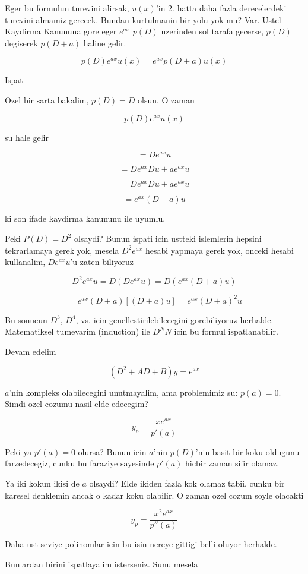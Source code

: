 \documentclass[12pt,fleqn]{article}
\begin{document}
Eger bu formulun turevini alirsak, $u(x)$'in 2. hatta daha fazla
derecelerdeki turevini almamiz gerecek. Bundan kurtulmanin bir yolu yok mu?
Var. Ustel Kaydirma Kanununa gore eger $e^{ax}$ $p(D)$ uzerinden sol tarafa
gecerse, $p(D)$ degiserek $p(D+a)$ haline gelir. 

\[ p(D)e^{ax}u(x) = e^{ax}p(D+a)u(x)\]

Ispat

Ozel bir sarta bakalim, $p(D) = D$ olsun. O zaman 

\[ p(D)e^{ax}u(x) \]

su hale gelir

\[ = De^{ax}u\]

\[ = De^{ax}Du + ae^{ax}u \]

\[ = De^{ax}Du + ae^{ax}u \]

\[ = e^{ax}(D + a)u \]

ki son ifade kaydirma kanununu ile uyumlu. 

Peki $P(D) = D^2$ olsaydi? Bunun ispati icin ustteki islemlerin hepsini
tekrarlamaya gerek yok, mesela $D^2e^{ax}$ hesabi yapmaya gerek yok,
onceki hesabi kullanalim, $De^{ax}u$'u zaten biliyoruz

\[  D^2e^{ax}u = D(De^{ax}u) = D(e^{ax}(D+a)u)  \]

\[ = e^{ax}(D+a)[(D+a)u] = e^{ax}(D+a)^2u \]

Bu sonucun $D^3$, $D^4$, vs. icin genellestirilebilecegini gorebiliyoruz
herhalde. Matematiksel tumevarim (induction) ile $D^NN$ icin bu formul
ispatlanabilir. 

Devam edelim

\[ (D^2+AD+B)y = e^{ax} \]

$a$'nin kompleks olabilecegini unutmayalim, ama problemimiz su: $p(a) =
0$.
Simdi ozel cozumu nasil elde edecegim? 

\[ y_p = \frac{x e^{ax}}{p'(a)} \]

Peki ya $p'(a) = 0$  olursa? Bunun icin $a$'nin $p(D)$'nin basit bir koku
oldugunu farzedecegiz, cunku bu faraziye sayesinde $p'(a)$ hicbir zaman
sifir olamaz. 

Ya iki kokun ikisi de $a$ olsaydi? Elde ikiden fazla kok olamaz tabii,
cunku bir karesel denklemin ancak o kadar koku olabilir. O zaman ozel cozum
soyle olacakti

\[ y_p = \frac{x^2e^{ax}}{p''(a)} \]

Daha ust seviye polinomlar icin bu isin nereye gittigi belli oluyor
herhalde. 

Bunlardan birini ispatlayalim isterseniz. Sunu mesela
\end{document}
